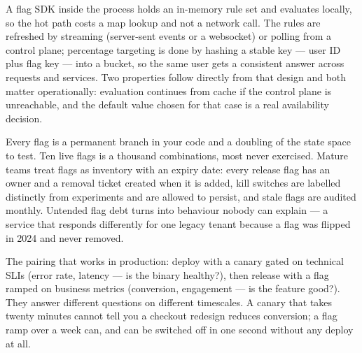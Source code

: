  A flag SDK inside the process holds an in-memory rule set and evaluates locally, so the hot path costs a map lookup and not a network call. The rules are refreshed by streaming (server-sent events or a websocket) or polling from a control plane; percentage targeting is done by hashing a stable key --- user ID plus flag key --- into a bucket, so the same user gets a consistent answer across requests and services. Two properties follow directly from that design and both matter operationally: evaluation continues from cache if the control plane is unreachable, and the default value chosen for that case is a real availability decision.

\begin{tradeoff}
Every flag is a permanent branch in your code and a doubling of the state space to test. Ten live flags is a thousand combinations, most never exercised. Mature teams treat flags as inventory with an expiry date: every release flag has an owner and a removal ticket created when it is added, kill switches are labelled distinctly from experiments and are allowed to persist, and stale flags are audited monthly. Untended flag debt turns into behaviour nobody can explain --- a service that responds differently for one legacy tenant because a flag was flipped in 2024 and never removed.
\end{tradeoff}

\begin{opsnote}
The pairing that works in production: deploy with a canary gated on technical SLIs (error rate, latency --- is the binary healthy?), then release with a flag ramped on business metrics (conversion, engagement --- is the feature good?). They answer different questions on different timescales. A canary that takes twenty minutes cannot tell you a checkout redesign reduces conversion; a flag ramp over a week can, and can be switched off in one second without any deploy at all.
\end{opsnote}


